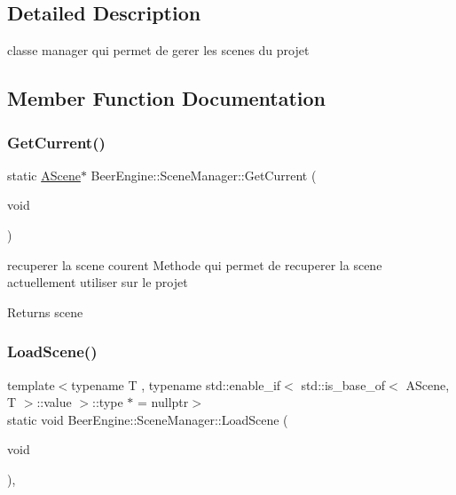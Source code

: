 \subsection{Detailed Description}
classe manager qui permet de gerer les scenes du projet 

\subsection{Member Function Documentation}
\mbox{\label{class_beer_engine_1_1_scene_manager_abf2128f0d4f9e0c77900bddc65237a18}} 
\subsubsection{\texorpdfstring{Get\+Current()}{GetCurrent()}}
{\footnotesize\ttfamily static \mbox{\hyperlink{class_beer_engine_1_1_a_scene}{A\+Scene}}$\ast$ Beer\+Engine\+::\+Scene\+Manager\+::\+Get\+Current (\begin{DoxyParamCaption}\item[{void}]{ }\end{DoxyParamCaption})\hspace{0.3cm}{\ttfamily [static]}}



recuperer la scene courent Methode qui permet de recuperer la scene actuellement utiliser sur le projet 

\begin{DoxyReturn}{Returns}
scene 
\end{DoxyReturn}
\mbox{\label{class_beer_engine_1_1_scene_manager_a9414ed3c9d4a170e198afe83d15db360}} 
\subsubsection{\texorpdfstring{Load\+Scene()}{LoadScene()}}
{\footnotesize\ttfamily template$<$typename T , typename std\+::enable\+\_\+if$<$ std\+::is\+\_\+base\+\_\+of$<$ A\+Scene, T $>$\+::value $>$\+::type $\ast$  = nullptr$>$ \\
static void Beer\+Engine\+::\+Scene\+Manager\+::\+Load\+Scene (\begin{DoxyParamCaption}\item[{void}]{ }\end{DoxyParamCaption})\hspace{0.3cm}{\ttfamily [inline]}, {\ttfamily [static]}}



